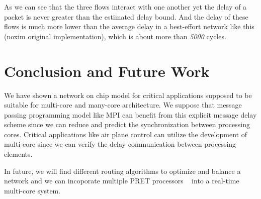 \documentclass[conference, twocolumn]{IEEEtran}
\theoremstyle{definition}
\begin{document}
As we can see that the three flows interact with one another yet the delay of a
packet is never greater than the estimated delay bound. And the delay of these
flows is much more lower than the average delay in a best-effort network like
this (noxim original implementation), which is about more than {\em 5000}
cycles.

\section{Conclusion and Future Work}
We have shown a network on chip model for critical applications supposed to be
suitable for multi-core and many-core architecture. We suppose that message
passing programming model like MPI can benefit from this explicit message
delay scheme since we can reduce and predict the synchronization between
processing cores. Critical applications like air plane control can utilize the
development of multi-core since we can verify the delay communication between
processing elements.

In future, we will find different routing algorithms to optimize and balance a
network and we can incoporate multiple PRET processors ~\cite{LicklyPRET} into
a real-time multi-core system.



\end{document}
